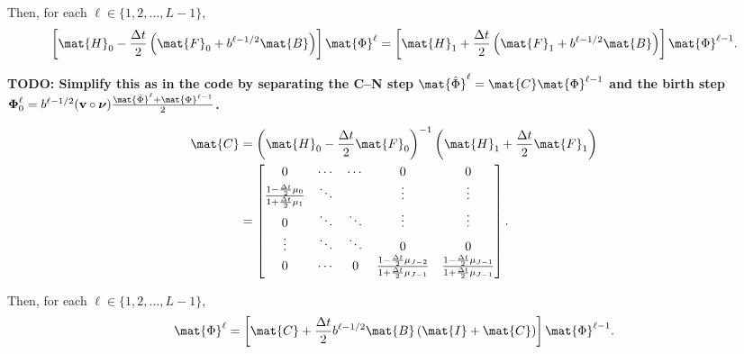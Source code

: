 \documentclass{jpmarticle}
\renewcommand{\vec}[1]{\boldsymbol{\mathrm{#1}}}
\let\subequationsorig\subequations%
\let\endsubequationsorig\endsubequations%
\renewenvironment{subequations}{
  \subequationsorig
  \renewcommand{\theequation}{\theparentequation.\arabic{equation}}
}{
  \endsubequationsorig
}
\begin{document}
Then, for each $\ell \in \{1, 2, \ldots, L - 1\}$,
\begin{equation}
  \left[
    \mat{H}_0
    - \frac{\Delta t}{2}
    \left(
      \mat{F}_0
      + b^{\ell - 1 / 2} \mat{B}
    \right)
  \right]
  \mat{\Phi}^{\ell}
  =
  \left[
    \mat{H}_1
    + \frac{\Delta t}{2}
    \left(
      \mat{F}_1
      + b^{\ell - 1 / 2} \mat{B}
    \right)
  \right]
  \mat{\Phi}^{\ell - 1}.
\end{equation}

\textbf{TODO: Simplify this as in the code by separating the C–N step
  $\mat{\hat{\Phi}}^{\ell} = \mat{C} \mat{\Phi}^{\ell - 1}$
  and the birth step
  $\vec{\Phi}_0^{\ell} = b^{\ell - 1 / 2} (\vec{v} \circ \vec{\nu})
  \frac{\mat{\hat{\Phi}}^{\ell} + \mat{\Phi}^{\ell - 1}}{2}$.}
\begin{subequations}
  \begin{align}
    \begin{split}
      \mat{C}
      &= \left(\mat{H}_0
        - \frac{\Delta t}{2} \mat{F}_0\right)^{-1}
      \left(\mat{H}_1
        + \frac{\Delta t}{2} \mat{F}_1\right)
      \\
      &=
      \begin{bmatrix}
        0 & \cdots & \cdots & 0 & 0
        \\
        \frac{1 - \frac{\Delta t}{2} \mu_0}
        {1 + \frac{\Delta t}{2} \mu_1}
        & \ddots & & \vdots & \vdots
        \\
        0 & \ddots & \ddots & \vdots & \vdots
        \\
        \vdots & \ddots & \ddots & 0 & 0
        \\
        0 & \cdots & 0 &
        \frac{1 - \frac{\Delta t}{2} \mu_{J - 2}}
        {1 + \frac{\Delta t}{2} \mu_{J - 1}}
        & \frac{1 - \frac{\Delta t}{2} \mu_{J - 1}}
        {1 + \frac{\Delta t}{2} \mu_{J - 1}}
      \end{bmatrix}.
    \end{split}
  \end{align}
\end{subequations}
Then, for each $\ell \in \{1, 2, \ldots, L - 1\}$,
\begin{equation}
  \mat{\Phi}^{\ell}
  =
  \left[\mat{C}
    +  \frac{\Delta t}{2} b^{\ell - 1 / 2} \mat{B}
    \left(\mat{I} + \mat{C}\right)
  \right]
  \mat{\Phi}^{\ell - 1}.
\end{equation}
\end{document}
